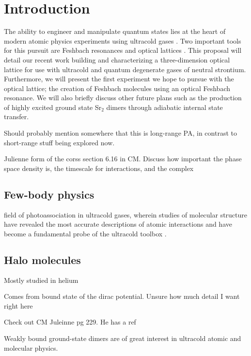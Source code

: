 \chapter{Introduction}
\label{ch:intro}

The ability to engineer and manipulate quantum states lies at the heart of modern atomic physics experiments using ultracold gases \cite{Davis1995,Anderson1995,Bradley1995,DeMarco1999,Lang2008,Ni2008}. 
Two important tools for this pursuit are Feshbach resonances \cite{Chin2010,Kohler2006} and optical lattices \cite{Bloch2008}. 
This proposal will detail our recent work building and characterizing a three-dimension optical lattice for use with ultracold and quantum degenerate gases of neutral strontium.
Furthermore, we will present the first experiment we hope to pursue with the optical lattice; the creation of Feshbach molecules using an optical Feshbach resonance. 
We will also briefly discuss other future plans such as the production of highly excited ground state Sr$_2$ dimers through adiabatic internal state transfer.

Should probably mention somewhere that this is long-range PA, in contrast to short-range stuff being explored now.

Julienne form of the corss section 6.16 in CM. Discuss how important the phase space density is, the timescale for interactions, and the complex 

\cite{Aman2018}

\section{Few-body physics}
\label{sec:few-body}

field of photoassociation in ultracold gases, wherein studies of molecular structure have revealed the most accurate descriptions of atomic interactions and have become a fundamental probe of the ultracold toolbox \cite{Jones2006}.

\section{Halo molecules}
\label{sec:halo}

Mostly studied in helium

Comes from bound state of the dirac potential. Unsure how much detail I want right here

Check out CM Juleinne pg 229. He has a ref

Weakly bound ground-state dimers are of great interest in ultracold atomic and molecular physics. 

